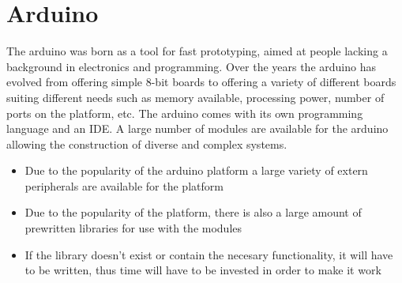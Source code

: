 \section{Arduino}
The arduino was born as a tool for fast prototyping, aimed at people lacking a
background in electronics and programming. Over the years the arduino has evolved from offering simple 8-bit boards to offering a variety of different boards suiting different needs such as memory available, processing power, number of ports on the platform, etc. The arduino comes with its own programming language and an IDE. A large number of modules are available for the arduino allowing the construction of diverse and complex systems\Source.
\begin{itemize}
	\item Due to the popularity of the arduino platform a large variety of extern peripherals are available for the platform
	\item Due to the popularity of the platform, there is also a large amount of prewritten libraries for use with the modules
	\item If the library doesn't exist or contain the necesary functionality, it will have to be written, thus time will have to be invested in order to make it work
\end{itemize}

